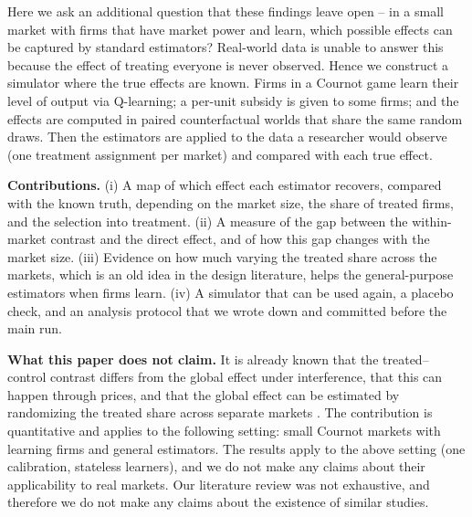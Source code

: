 \documentclass[11pt]{article}
\begin{document}
Here we ask an additional question that these findings leave open -- in a small market with firms that have market power and learn, which possible effects can be captured by standard estimators? Real-world data is unable to answer this because the effect of treating everyone is never observed. Hence we construct a simulator where the true effects are known. Firms in a Cournot game learn their level of output via Q-learning; a per-unit subsidy is given to some firms; and the effects are computed in paired counterfactual worlds that share the same random draws. Then the estimators are applied to the data a researcher would observe (one treatment assignment per market) and compared with each true effect.

\textbf{Contributions.} (i) A map of which effect each estimator recovers, compared with the known truth, depending on the market size, the share of treated firms, and the selection into treatment. (ii) A measure of the gap between the within-market contrast and the direct effect, and of how this gap changes with the market size. (iii) Evidence on how much varying the treated share across the markets, which is an old idea in the design literature, helps the general-purpose estimators when firms learn. (iv) A simulator that can be used again, a placebo check, and an analysis protocol that we wrote down and committed before the main run.

\textbf{What this paper does not claim.} It is already known that the treated--control contrast differs from the global effect under interference, that this can happen through prices, and that the global effect can be estimated by randomizing the treated share across separate markets \citep{baird2018,mkw2025}. The contribution is quantitative and applies to the following setting: small Cournot markets with learning firms and general estimators. The results apply to the above setting (one calibration, stateless learners), and we do not make any claims about their applicability to real markets. Our literature review was not exhaustive, and therefore we do not make any claims about the existence of similar studies.
\end{document}
